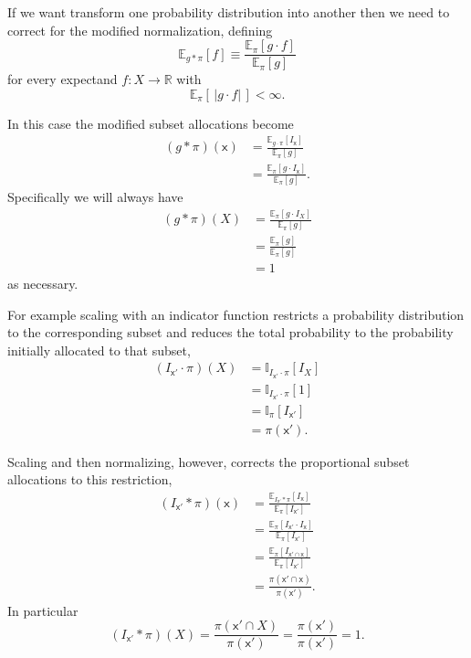 \documentclass[
  letterpaper,
  DIV=11,
  numbers=noendperiod]{scrartcl}
\begin{document}
If we want transform one probability distribution into another then we
need to correct for the modified normalization, defining \[
\mathbb{E}_{g \ast \pi} [ f ] \equiv
\frac{ \mathbb{E}_{\pi} [ g \cdot f ] }{ \mathbb{E}_{\pi} [ g ] }
\] for every expectand \(f: X \rightarrow \mathbb{R}\) with \[
\mathbb{E}_{\pi} [ \, | g \cdot f | \, ] < \infty.
\]

In this case the modified subset allocations become \begin{align*}
(g \ast \pi)(\mathsf{x})
&=
\frac{ \mathbb{E}_{g \cdot \pi} [ I_{\mathsf{x}} ] }
{ \mathbb{E}_{\pi} [ g ] }
\\
&=
\frac{ \mathbb{E}_{\pi} [ g \cdot I_{\mathsf{x}} ] }
{ \mathbb{E}_{\pi} [ g ] }.
\end{align*} Specifically we will always have \begin{align*}
(g \ast \pi)(X)
&=
\frac{ \mathbb{E}_{\pi} [ g \cdot I_{X} ] }
{ \mathbb{E}_{\pi} [ g ] }
\\
&=
\frac{ \mathbb{E}_{\pi} [ g ] }
{ \mathbb{E}_{\pi} [ g ] }
\\
&=
1
\end{align*} as necessary.

For example scaling with an indicator function restricts a probability
distribution to the corresponding subset and reduces the total
probability to the probability initially allocated to that subset,
\begin{align*}
(I_{\mathsf{x}'} \cdot \pi)(X)
&=
\mathbb{I}_{I_{\mathsf{x}'} \cdot \pi} [ I_{X} ]
\\
&=
\mathbb{I}_{I_{\mathsf{x}'} \cdot \pi} [ 1 ]
\\
&=
\mathbb{I}_{\pi} [ I_{\mathsf{x}'} ]
\\
&=
\pi(\mathsf{x}').
\end{align*}

Scaling and then normalizing, however, corrects the proportional subset
allocations to this restriction, \begin{align*}
(I_{\mathsf{x}'} \ast \pi)( \mathsf{x} )
&=
\frac{ \mathbb{E}_{I_{\mathsf{x}'} \ast \pi} [ I_{\mathsf{x}} ] }
{ \mathbb{E}_{\pi} [ I_{\mathsf{x}'} ] }
\\
&=
\frac{ \mathbb{E}_{\pi} [ I_{\mathsf{x}'} \cdot I_{\mathsf{x}} ] }
{ \mathbb{E}_{\pi} [ I_{\mathsf{x}'} ] }
\\
&=
\frac{ \mathbb{E}_{\pi} [ I_{\mathsf{x}' \cap \mathsf{x}} ] }
{ \mathbb{E}_{\pi} [ I_{\mathsf{x}'} ] }
\\
&=
\frac{ \pi(\mathsf{x}' \cap \mathsf{x}) }
{ \pi(\mathsf{x}') }.
\end{align*} In particular \[
(I_{\mathsf{x}'} \ast \pi)( X )
=
\frac{ \pi(\mathsf{x}' \cap X) }{ \pi(\mathsf{x}') }
=
\frac{ \pi(\mathsf{x}') }{ \pi(\mathsf{x}') }
=
1.
\]
\end{document}
